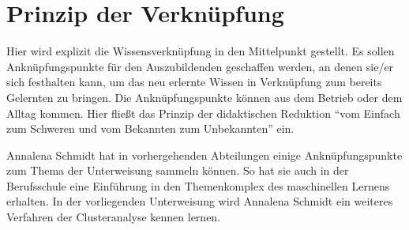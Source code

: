 \section{Prinzip der Verknüpfung}
Hier wird explizit die Wissensverknüpfung in den Mittelpunkt gestellt. Es sollen Anknüpfungspunkte für den Auszubildenden geschaffen werden, an denen sie/er sich festhalten kann, um das neu erlernte Wissen in Verknüpfung zum bereits Gelernten zu bringen. Die Anknüpfungspunkte können aus dem Betrieb oder dem Alltag kommen. Hier fließt das Prinzip der didaktischen Reduktion \enquote{vom Einfach zum Schweren und vom Bekannten zum Unbekannten} ein.
\par
Annalena Schmidt hat in vorhergehenden Abteilungen einige Anknüpfungspunkte zum Thema der Unterweisung sammeln können. So hat sie auch in der Berufsschule eine Einführung in den Themenkomplex des maschinellen Lernens erhalten. In der vorliegenden Unterweisung wird Annalena Schmidt ein weiteres Verfahren der Clusteranalyse kennen lernen. 

